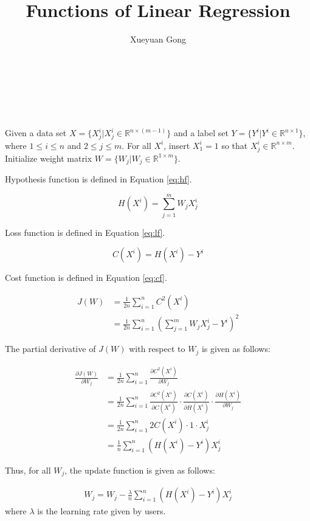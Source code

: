 \documentclass{sig-alternate}
\begin{document}
\title{Functions of Linear Regression}

\author{
	\alignauthor
	Xueyuan Gong\\
	\\
	\\
    \\
    \\
}

\maketitle

Given a data set $X=\{X^{i}_{j}|X^{i}_{j}\in \mathbb{R}^{n\times (m-1)}\}$ and a label set $Y=\{Y^{i}|Y^{i}\in \mathbb{R}^{n\times 1}\}$, where $1\leq i\leq n$ and $2\leq j \leq m$. For all $X^{i}$, insert $X^{i}_{1}=1$ so that $X^{i}_{j}\in \mathbb{R}^{n\times m}$. Initialize weight matrix $W=\{W_{j}|W_{j}\in \mathbb{R}^{1\times m}\}$.

Hypothesis function is defined in Equation \eqref{eq:hf}.

\begin{equation}
\label{eq:hf}
	H(X^{i})=\sum_{j=1}^{m}W_{j}X^{i}_{j}
\end{equation}

Loss function is defined in Equation \eqref{eq:lf}.

\begin{equation}
\label{eq:lf}
	C(X^{i})=H(X^{i})-Y^{i}
\end{equation}

Cost function is defined in Equation \eqref{eq:cf}.

\begin{equation}
\label{eq:cf}
	\begin{aligned}
	J(W)&=\frac{1}{2n}\sum_{i=1}^{n}C^2(X^{i})\\
		&=\frac{1}{2n}\sum_{i=1}^{n}(\sum_{j=1}^{m}W_{j}X^{i}_{j}-Y^{i})^{2}
	\end{aligned}
\end{equation}

The partial derivative of $J(W)$ with respect to $W_{j}$ is given as follows:

\begin{align*}
	\frac{\partial{J(W)}}{\partial{W_{j}}}
	&=\frac{1}{2n}\sum_{i=1}^{n}\frac{\partial{C^2(X^{i})}}{\partial{W_{j}}}\\
	&=\frac{1}{2n}\sum_{i=1}^{n}\frac{\partial{C^2(X^{i})}}{\partial{C(X^{i})}}\cdot \frac{\partial{C(X^{i})}}{\partial{H(X^{i})}}\cdot \frac{\partial{H(X^{i})}}{\partial{W_{j}}}\\
	&=\frac{1}{2n}\sum_{i=1}^{n}2C(X^{i})\cdot 1\cdot X^{i}_{j}\\
	&=\frac{1}{n}\sum_{i=1}^{n}(H(X^{i})-Y^{i})X^{i}_{j}
\end{align*}

Thus, for all $W_{j}$, the update function is given as follows:

\begin{align*}
	W_{j}=W_{j}-\frac{\lambda}{n}\sum_{i=1}^{n}(H(X^{i})-Y^{i})X^{i}_{j}
\end{align*}
where $\lambda$ is the learning rate given by users.
\end{document}

